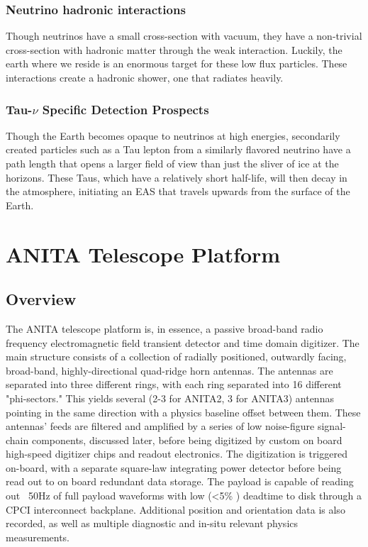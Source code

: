 	\subsection{Neutrino hadronic interactions}
		Though neutrinos have a small cross-section with vacuum, they have a non-trivial cross-section with hadronic matter through the weak interaction.  Luckily, the earth where we reside is an enormous target for these low flux particles.  These interactions create a hadronic shower, one that radiates heavily.

	\subsection{Tau-$\nu$ Specific Detection Prospects}
		Though the Earth becomes opaque to neutrinos at high energies, secondarily created particles such as a Tau lepton from a similarly flavored neutrino have a path length that opens a larger field of view than just the sliver of ice at the horizons.  These Taus, which have a relatively short half-life, will then decay in the atmosphere, initiating an EAS that travels upwards from the surface of the Earth.






\chapter{ANITA Telescope Platform}
\section{Overview}
	The ANITA telescope platform is, in essence, a passive broad-band radio frequency electromagnetic field transient detector and time domain digitizer.  The main structure consists of a collection of radially positioned, outwardly facing, broad-band, highly-directional quad-ridge horn antennas.  The antennas are separated into three different rings, with each ring separated into 16 different "phi-sectors."  This yields several (2-3 for ANITA2, 3 for ANITA3) antennas pointing in the same direction with a physics baseline offset between them. These antennas' feeds are filtered and amplified by a series of low noise-figure signal-chain components, discussed later, before being digitized by custom on board high-speed digitizer chips and readout electronics.  The digitization is triggered on-board, with a separate square-law integrating power detector before being read out to on board redundant data storage.  The payload is capable of reading out ~50Hz of full payload waveforms with low (\textless 5\% ) deadtime to disk through a CPCI interconnect backplane.  Additional position and orientation data is also recorded, as well as multiple diagnostic and in-situ relevant physics measurements.
	
